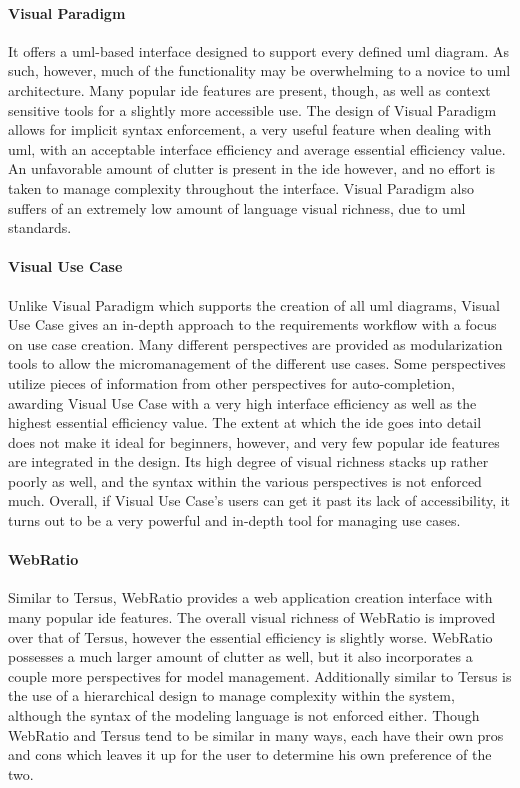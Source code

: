 \paragraph{Visual Paradigm} It offers a \ac{uml}-based
interface designed to support every defined \ac{uml} diagram. As such,
however, much of the functionality may be overwhelming to a novice to \ac{uml}
architecture. Many popular \ac{ide} features are present, though, as well
as context sensitive tools for a slightly more accessible use. The design of Visual
Paradigm allows for implicit syntax enforcement, a very useful
feature when dealing with \ac{uml}, with an acceptable interface
efficiency and average essential efficiency value. An unfavorable amount of
clutter is present in the \ac{ide} however, and no effort is taken to
manage complexity throughout the interface. Visual Paradigm also suffers of an extremely low
amount of language visual richness, due to \ac{uml} standards.

\paragraph{Visual Use Case} Unlike Visual Paradigm which supports the
creation of all \ac{uml} diagrams, Visual Use Case gives an in-depth
approach to the requirements workflow with a focus on use case creation.
Many different perspectives are provided as modularization tools to allow
the micromanagement of the different use cases. Some perspectives utilize
pieces of information from other perspectives for auto-completion, awarding
Visual Use Case with a very high interface efficiency as well as the
highest essential efficiency value. The extent at which the \ac{ide} goes
into detail does not make it ideal for beginners, however, and very few
popular \ac{ide} features are integrated in the design. Its high degree of
visual richness stacks up rather poorly as well, and the syntax within the
various perspectives is not enforced much. Overall, if Visual Use Case's
users can get it past its lack of accessibility, it turns out to be a very
powerful and in-depth tool for managing use cases.

\paragraph{WebRatio} Similar to Tersus, WebRatio provides a web application
creation interface with many popular \ac{ide} features. The overall visual
richness of WebRatio is improved over that of Tersus, however the essential
efficiency is slightly worse. WebRatio possesses a much larger amount of
clutter as well, but it also incorporates a couple more perspectives for
model management. Additionally similar to Tersus is the use of a
hierarchical design to manage complexity within the system, although the
syntax of the modeling language is not enforced either. Though WebRatio and
Tersus tend to be similar in many ways, each have their own pros and cons
which leaves it up for the user to determine his own preference of the
two.

